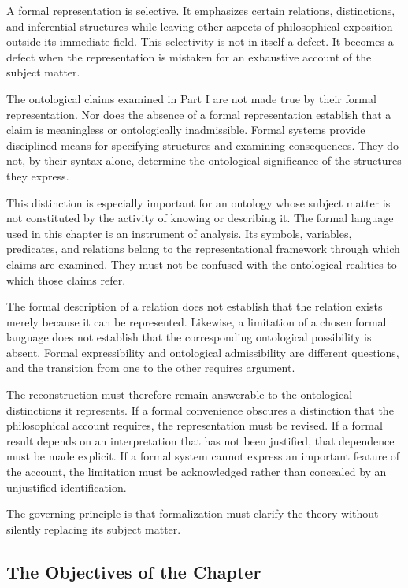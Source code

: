A formal representation is selective. It emphasizes certain relations,
distinctions, and inferential structures while leaving other aspects of
philosophical exposition outside its immediate field. This selectivity is
not in itself a defect. It becomes a defect when the representation is
mistaken for an exhaustive account of the subject matter.

The ontological claims examined in Part I are not made true by their
formal representation. Nor does the absence of a formal representation
establish that a claim is meaningless or ontologically inadmissible. Formal
systems provide disciplined means for specifying structures and examining
consequences. They do not, by their syntax alone, determine the ontological
significance of the structures they express.

This distinction is especially important for an ontology whose subject
matter is not constituted by the activity of knowing or describing it. The
formal language used in this chapter is an instrument of analysis. Its
symbols, variables, predicates, and relations belong to the representational
framework through which claims are examined. They must not be confused with
the ontological realities to which those claims refer.

The formal description of a relation does not establish that the relation
exists merely because it can be represented. Likewise, a limitation of a
chosen formal language does not establish that the corresponding ontological
possibility is absent. Formal expressibility and ontological admissibility
are different questions, and the transition from one to the other requires
argument.

The reconstruction must therefore remain answerable to the ontological
distinctions it represents. If a formal convenience obscures a distinction
that the philosophical account requires, the representation must be
revised. If a formal result depends on an interpretation that has not been
justified, that dependence must be made explicit. If a formal system cannot
express an important feature of the account, the limitation must be
acknowledged rather than concealed by an unjustified identification.

The governing principle is that formalization must clarify the theory
without silently replacing its subject matter.

\subsection{The Objectives of the Chapter}

